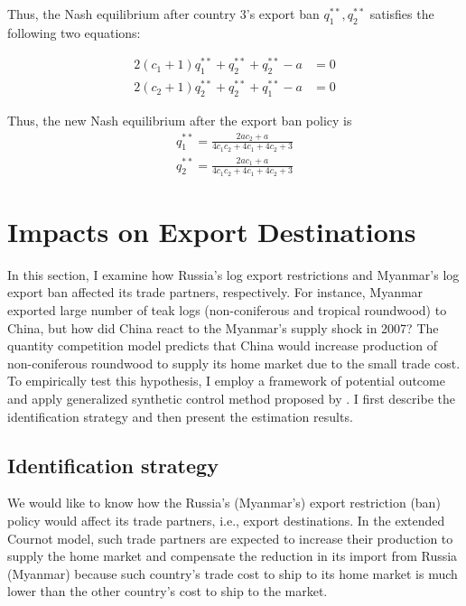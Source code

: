 \documentclass[a4paper,12pt]{article}
\begin{document}
Thus, the Nash equilibrium after country $3$'s export ban $q_1^{**}, q_2^{**}$ satisfies the following two equations:

\begin{align}
    2(c_1 + 1) q_1^{**} + q_2 ^{**} + q_2 ^ {**} - a &= 0 \\
    2(c_2 + 1) q_2^{**} + q_2 ^{**} + q_1 ^ {**} - a &= 0 
\end{align}

Thus, the new Nash equilibrium after the export ban policy is
\begin{align}
    q_1^{**} = \frac{2 a c_{2} + a}{4 c_{1} c_{2} + 4 c_{1} + 4 c_{2} + 3} \\
    q_2^{**} = \frac{2 a c_{1} + a}{4 c_{1} c_{2} + 4 c_{1} + 4 c_{2} + 3}
\end{align}

\section{Impacts on Export Destinations}
In this section, I examine how Russia's log export restrictions and Myanmar's log export ban affected its trade partners, respectively. For instance, Myanmar exported large number of teak logs (non-coniferous and tropical roundwood) to China, but how did China react to the Myanmar's supply shock in 2007? The quantity competition model predicts that China would increase production of non-coniferous roundwood to supply its home market due to the small trade cost. To empirically test this hypothesis, I employ a framework of potential outcome and apply generalized synthetic control method proposed by \cite{xu2017generalized}. I first describe the identification strategy and then present the estimation results.

\subsection{Identification strategy}

We would like to know how the Russia's (Myanmar's) export restriction (ban) policy would affect its trade partners, i.e., export destinations. In the extended Cournot model, such trade partners are expected to increase their production to supply the home market and compensate the reduction in its import from Russia (Myanmar) because such country's trade cost to ship to its home market is much lower than the other country's cost to ship to the market. \\
\end{document}

